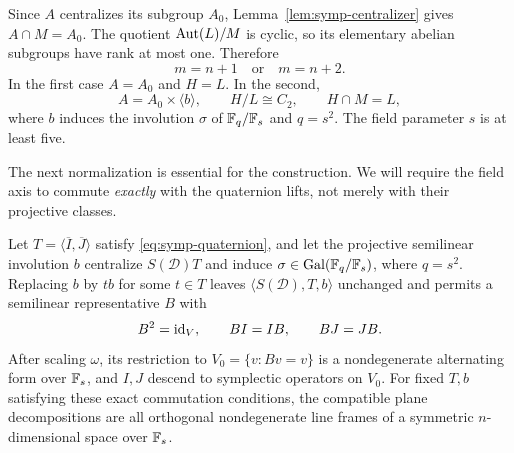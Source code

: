 Since $A$ centralizes its subgroup $A_0$, Lemma~\ref{lem:symp-centralizer}
gives $A\cap M=A_0$.  The quotient $\operatorname{Aut}(L)/M$ is cyclic, so its
elementary abelian subgroups have rank at most one.  Therefore
\begin{equation}\label{eq:symp-ranks}
m=n+1\quad\text{or}\quad m=n+2.
\end{equation}
In the first case $A=A_0$ and $H=L$.  In the second,
\[
A=A_0\times\langle b\rangle,
\qquad H/L\cong C_2,\qquad H\cap M=L,
\]
where $b$ induces the involution $\sigma$ of $\mathbb F_q/\mathbb F_s$ and
$q=s^2$.  The field parameter $s$ is at least five.

The next normalization is essential for the construction.  We will
require the field axis to commute \emph{exactly} with the quaternion
lifts, not merely with their projective classes.

\begin{lemma}\label{lem:symp-descent}
Let $T=\langle\overline I,\overline J\rangle$ satisfy
\eqref{eq:symp-quaternion}, and let the projective semilinear
involution $b$ centralize $S(\mathcal D)T$ and induce
$\sigma\in\operatorname{Gal}(\mathbb F_q/\mathbb F_s)$, where $q=s^2$.  Replacing $b$ by
$tb$ for some $t\in T$ leaves $\langle S(\mathcal D),T,b\rangle$
unchanged and permits a semilinear representative $B$ with
\[
B^2=\operatorname{id}_V,\qquad BI=IB,\qquad BJ=JB.
\]
After scaling $\omega$, its restriction to $V_0=\{v:Bv=v\}$ is a
nondegenerate alternating form over $\mathbb F_s$, and $I,J$ descend to
symplectic operators on $V_0$.  For fixed $T,b$ satisfying these exact
commutation conditions, the compatible plane decompositions are all
orthogonal nondegenerate line frames of a symmetric
$n$-dimensional space over $\mathbb F_s$.
\end{lemma}

